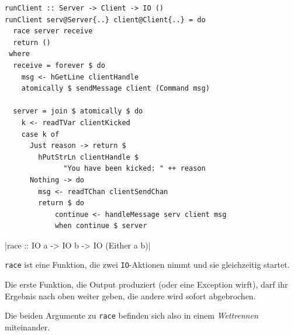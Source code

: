 \documentclass{beamer}
\begin{document}

\begin{frame}[fragile]

\begin{verbatim}
runClient :: Server -> Client -> IO ()
runClient serv@Server{..} client@Client{..} = do
  race server receive
  return ()
 where
  receive = forever $ do
    msg <- hGetLine clientHandle
    atomically $ sendMessage client (Command msg)

  server = join $ atomically $ do
    k <- readTVar clientKicked
    case k of
      Just reason -> return $
        hPutStrLn clientHandle $
              "You have been kicked: " ++ reason
      Nothing -> do
        msg <- readTChan clientSendChan
        return $ do
            continue <- handleMessage serv client msg
            when continue $ server
\end{verbatim}

\end{frame}


\begin{frame}[fragile]

|race :: IO a -> IO b -> IO (Either a b)|
\bigskip

\texttt{race} ist eine Funktion, die zwei \texttt{IO}-Aktionen nimmt und sie gleichzeitig 
startet.\pause\smallskip\smallskip

Die erste Funktion, die Output produziert (oder eine Exception wirft), darf ihr Ergebnis nach oben weiter geben, die andere wird sofort abgebrochen.

Die beiden Argumente zu \texttt{race} befinden sich also in einem \emph{Wettrennen} miteinander.
\end{frame}

\end{document}
